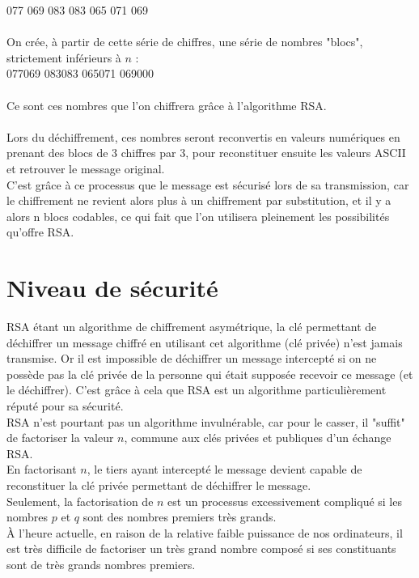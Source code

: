 		077 069 083 083 065 071 069\\
		\\
		On crée, à partir de cette série de chiffres, une série de nombres "blocs", strictement inférieurs à $n$ :\\
		077069 083083 065071 069000\\
		\\
		Ce sont ces nombres que l'on chiffrera grâce à l'algorithme RSA.\\
		\\
		Lors du déchiffrement, ces nombres seront reconvertis en valeurs numériques en prenant des blocs de 3 chiffres par 3, pour reconstituer ensuite les valeurs ASCII et retrouver le message original.\\
		C'est grâce à ce processus que le message est sécurisé lors de sa transmission, car le chiffrement ne revient alors plus à un chiffrement par substitution, et il y a alors n blocs codables, ce qui fait que l'on utilisera pleinement les possibilités qu'offre RSA.
	\section{Niveau de sécurité}
		RSA étant un algorithme de chiffrement asymétrique, la clé permettant de déchiffrer un message chiffré en utilisant cet algorithme (clé privée) n'est jamais transmise. Or il est impossible de déchiffrer un message intercepté si on ne possède pas la clé privée de la personne qui était supposée recevoir ce message (et le déchiffrer). C'est grâce à cela que RSA est un algorithme particulièrement réputé pour sa sécurité.\\
		RSA n'est pourtant pas un algorithme invulnérable, car pour le casser, il "suffit" de factoriser la valeur $n$, commune aux clés privées et publiques d'un échange RSA.\\
		En factorisant $n$, le tiers ayant intercepté le message devient capable de reconstituer la clé privée permettant de déchiffrer le message.\\
		Seulement, la factorisation de $n$ est un processus excessivement compliqué si les nombres $p$ et $q$ sont des nombres premiers très grands.\\
		À l'heure actuelle, en raison de la relative faible puissance de nos ordinateurs, il est très difficile de factoriser un très grand nombre composé si ses constituants sont de très grands nombres premiers.
